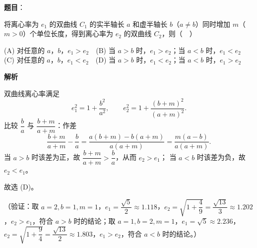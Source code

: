 \begin{answer}

\textbf{题目}：

将离心率为 \(e_1\) 的双曲线 \(C_1\) 的实半轴长 \(a\) 和虚半轴长 \(b\)（\(a\neq b\)）同时增加 \(m\)（\(m>0\)）个单位长度，得到离心率为 \(e_2\) 的双曲线 \(C_2\)，则（　）

(A) 对任意的 \(a\)，\(b\)，\(e_1>e_2\)　(B) 当 \(a>b\) 时，\(e_1>e_2\)；当 \(a<b\) 时，\(e_1<e_2\)　(C) 对任意的 \(a\)，\(b\)，\(e_1<e_2\)　(D) 当 \(a>b\) 时，\(e_1<e_2\)；当 \(a<b\) 时，\(e_1>e_2\)

\textbf{解析}

双曲线离心率满足
\nopagebreak[4]
\[
e_1^2=1+\dfrac{b^2}{a^2},\qquad e_2^2=1+\dfrac{(b+m)^2}{(a+m)^2}.
\]
比较 \(\dfrac{b}{a}\) 与 \(\dfrac{b+m}{a+m}\)：作差
\nopagebreak[4]
\[
\dfrac{b+m}{a+m}-\dfrac{b}{a}
=\dfrac{a(b+m)-b(a+m)}{a(a+m)}
=\dfrac{m(a-b)}{a(a+m)}.
\]
当 \(a>b\) 时该差为正，故 \(\dfrac{b+m}{a+m}>\dfrac{b}{a}\)，从而 \(e_2>e_1\)；
当 \(a<b\) 时该差为负，故 \(e_2<e_1\)。

故选 (D)。

（验证：取 \(a=2,b=1,m=1\)，\(e_1=\dfrac{\sqrt5}{2}\approx1.118\)，\(e_2=\sqrt{1+\dfrac49}=\dfrac{\sqrt{13}}{3}\approx1.202\)，\(e_2>e_1\)，符合 \(a>b\) 时的结论；取 \(a=1,b=2,m=1\)，\(e_1=\sqrt5\approx2.236\)，\(e_2=\sqrt{1+\dfrac94}=\dfrac{\sqrt{13}}{2}\approx1.803\)，\(e_1>e_2\)，符合 \(a<b\) 时的结论。）


\end{answer}
